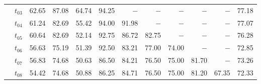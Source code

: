 \begin{table}[ht]
\begin{tabular}{@{}l l r r r r r r r r r r@{}}
 & $t_{03}$ & 62.65 & 87.08 & 64.74 & 94.25 & $-$ & $-$ & $-$ & $-$ & $-$ & 77.18 \\
 & $t_{04}$ & 61.24 & 82.69 & 55.42 & 94.00 & 91.98 & $-$ & $-$ & $-$ & $-$ & 77.07 \\
 & $t_{05}$ & 60.64 & 82.69 & 52.14 & 92.75 & 86.72 & 82.75 & $-$ & $-$ & $-$ & 76.28 \\
 & $t_{06}$ & 56.63 & 75.19 & 51.39 & 92.50 & 83.21 & 77.00 & 74.00 & $-$ & $-$ & 72.85 \\
 & $t_{07}$ & 56.83 & 74.68 & 50.63 & 86.50 & 84.21 & 76.50 & 75.00 & 81.70 & $-$ & 73.26 \\
 & $t_{08}$ & 54.42 & 74.68 & 50.88 & 86.25 & 84.71 & 76.50 & 75.00 & 81.20 & 67.35 & 72.33 \\
\bottomrule
\end{tabular}
\end{table}

